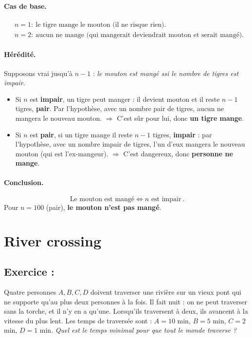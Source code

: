\paragraph{Cas de base.}

\begin{align*}
&n=1:\ \text{le tigre mange le mouton (il ne risque rien).}\\
&n=2:\ \text{aucun ne mange (qui mangerait deviendrait mouton et serait mangé).}    
\end{align*}
    
\paragraph{Hérédité.}
Supposons vrai jusqu’à $n-1$ : \emph{le mouton est mangé ssi le nombre de tigres est impair}.
\begin{itemize}
  \item Si $n$ est \textbf{impair}, un tigre peut manger : il devient mouton et il reste $n-1$ tigres, \textbf{pair}. Par l’hypothèse, avec un nombre pair de tigres, aucun ne mangera le nouveau mouton. \(\Rightarrow\) C’est sûr pour lui, donc \textbf{un tigre mange}.
  \item Si $n$ est \textbf{pair}, si un tigre mange il reste $n-1$ tigres, \textbf{impair} : par l’hypothèse, avec un nombre impair de tigres, l’un d’eux mangera le nouveau mouton (qui est l’ex-mangeur). \(\Rightarrow\) C’est dangereux, donc \textbf{personne ne mange}.
\end{itemize}

\paragraph{Conclusion.}
\[
\boxed{\ \text{Le mouton est mangé} \iff n \text{ est impair}\ }.
\]
Pour $n=100$ (pair), \textbf{le mouton n’est pas mangé}.

\section{River crossing}

\subsection*{Exercice :}

\begin{exerciseBox}
Quatre personnes $A,B,C,D$ doivent traverser une rivière sur un vieux pont qui ne supporte
qu'au plus deux personnes à la fois. Il fait nuit : on ne peut traverser sans la torche, et il n'y en a qu'une.
Lorsqu'ils traversent à deux, ils avancent à la vitesse du plus lent.
Les temps de traversée sont : $A=10$ min, $B=5$ min, $C=2$ min, $D=1$ min.
\emph{Quel est le temps minimal pour que tout le monde traverse ?}
\end{exerciseBox}

